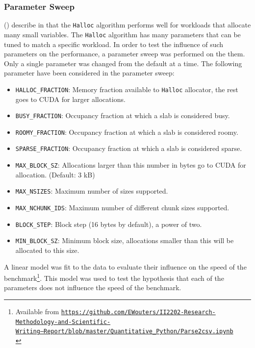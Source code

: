\documentclass[12pt,twoside]{article}
\begin{document}

\subsubsection*{Parameter Sweep}
\citeauthor{Vinkler2015} (\citeyear{Vinkler2015}) describe in \cite{Vinkler2015} that the \texttt{Halloc} algorithm performs well for workloads that allocate many small variables. The \texttt{Halloc} algorithm has many parameters that can be tuned to match a specific workload. In order to test the influence of such parameters on the performance, a parameter sweep was performed on the them. Only a single parameter was changed from the default at a time. The following parameter have been considered in the parameter sweep:
\begin{itemize}
\vspace{-3px}
\itemsep-0.25em 
\item \texttt{HALLOC\_FRACTION}: Memory fraction available to \texttt{Halloc} allocator, the rest goes to CUDA for
	larger allocations.
\item \texttt{BUSY\_FRACTION}: Occupancy fraction at which a slab is considered busy.
\item \texttt{ROOMY\_FRACTION}: Occupancy fraction at which a slab is considered roomy.
\item \texttt{SPARSE\_FRACTION}: Occupancy fraction at which a slab is considered sparse.
\item \texttt{MAX\_BLOCK\_SZ}: Allocations larger than this number in bytes go to CUDA for allocation. (Default: 3 kB)
\item \texttt{MAX\_NSIZES}: Maximum number of sizes supported.
\item \texttt{MAX\_NCHUNK\_IDS}: Maximum number of different chunk sizes supported.
\item \texttt{BLOCK\_STEP}: Block step (16 bytes by default), a power of two.
\item \texttt{MIN\_BLOCK\_SZ}: Minimum block size, allocations smaller than this will be allocated to this size.
\end{itemize}

A linear model was fit to the data to evaluate their influence on the speed of the benchmark\footnote{Available from \texttt{\href{https://github.com/EWouters/II2202-Research-Methodology-and-Scientific-Writing---Report/blob/master/Quantitative_Python/Parse2csv.ipynb}{https://github.com/EWouters/II2202-Research-Methodology-and-Scientific-\\Writing---Report/blob/master/Quantitative\_Python/Parse2csv.ipynb}}\\}. This model was used to test the hypothesis that each of the parameters does not influence the speed of the benchmark.
\end{document}
